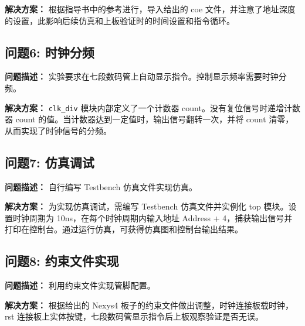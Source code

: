 \textbf{解决方案：} 根据指导书中的参考进行，导入给出的 coe 文件，并注意了地址深度的设置，此影响后续仿真和上板验证时的时间设置和指令循环。

\subsection{问题6: 时钟分频}
\textbf{问题描述：} 实验要求在七段数码管上自动显示指令。控制显示频率需要时钟分频。

\textbf{解决方案：} \texttt{clk\_div} 模块内部定义了一个计数器 count。没有复位信号时递增计数器 count 的值。当计数器达到一定值时，输出信号翻转一次，并将 count 清零，从而实现了时钟信号的分频。

\subsection{问题7: 仿真调试}
\textbf{问题描述：} 自行编写 Testbench 仿真文件实现仿真。

\textbf{解决方案：} 为实现仿真调试，需编写 Testbench 仿真文件并实例化 top 模块。设置时钟周期为 10ns，在每个时钟周期内输入地址 Address + 4，捕获输出信号并打印在控制台。通过运行仿真，可获得仿真图和控制台输出结果。

\subsection{问题8: 约束文件实现}
\textbf{问题描述：} 利用约束文件实现管脚配置。

\textbf{解决方案：} 根据给出的 Nexys4 板子的约束文件做出调整，时钟连接板载时钟，rst 连接板上实体按键，七段数码管显示指令后上板观察验证是否无误。